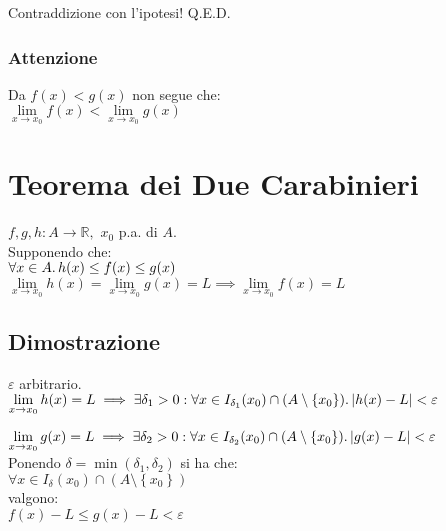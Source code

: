 \documentclass[a4paper, twoside, italian, 11pt]{book}
\newcommand{\braces}[1] {\left \{ #1 \right \}}
\newcommand{\abs}[1] {\left | #1 \right |}
\newcommand{\R}{\mathbb{R}}
\begin{document}
\noindent
Contraddizione con l'ipotesi! Q.E.D.


\subsubsection{Attenzione}

\noindent
Da $f(x) < g(x)$ non segue che: \\

$\lim\limits_{x \to x_0} f(x) < \lim\limits_{x \to x_0} g(x)$



\section{Teorema dei Due Carabinieri}

\noindent
$f, g, h : A \rightarrow \R,$ $x_0$ p.a. di $A$. \\

\noindent
Supponendo che: \\

$\forall x \in A \ldotp h(x) \leq f(x) \leq g(x)$ \\

\noindent
$\lim\limits_{x \to x_0} h(x) = \lim\limits_{x \to x_0} g(x) = L \implies \lim\limits_{x \to x_0} f(x) = L$


\subsection{Dimostrazione}

\noindent
$\varepsilon$ arbitrario. \\

$\lim\limits_{x \to x_0} h(x) = L \implies \exists \delta_1 > 0 : \forall x \in I_{\delta_1}(x_0) \cap (A \setminus \braces{x_0}) \ldotp \abs{h(x) - L} < \varepsilon$

$\lim\limits_{x \to x_0} g(x) = L \implies \exists \delta_2 > 0 : \forall x \in I_{\delta_2}(x_0) \cap (A \setminus \braces{x_0}) \ldotp \abs{g(x) - L} < \varepsilon$ \\

\noindent
Ponendo $\delta = \min(\delta_1, \delta_2)$ si ha che: \\

$\forall x \in I_{\delta}(x_0) \cap (A \setminus \braces{x_0})$ \\

\noindent
valgono: \\

$f(x) - L \leq g(x) - L < \varepsilon$
\end{document}
